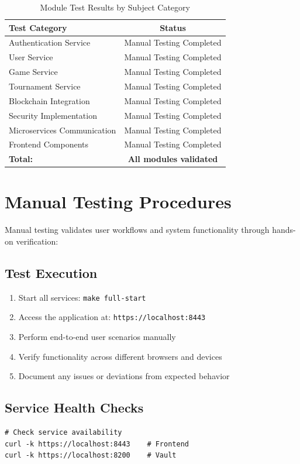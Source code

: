 \documentclass[11pt,a4paper]{report}
\begin{document}
\begin{table}[H]
\centering
\begin{tabular}{|l|c|}
\hline
\textbf{Test Category} & \textbf{Status} \\
\hline
Authentication Service & Manual Testing Completed \\
User Service & Manual Testing Completed \\
Game Service & Manual Testing Completed \\
Tournament Service & Manual Testing Completed \\
Blockchain Integration & Manual Testing Completed \\
Security Implementation & Manual Testing Completed \\
Microservices Communication & Manual Testing Completed \\
Frontend Components & Manual Testing Completed \\
\hline
\textbf{Total:} & \textbf{All modules validated} \\
\hline
\end{tabular}
\caption{Module Test Results by Subject Category}
\label{tab:test_results}
\end{table}

\section{Manual Testing Procedures}
\label{sec:manual_testing}

Manual testing validates user workflows and system functionality through hands-on verification:

\subsection{Test Execution}
\begin{enumerate}
  \item Start all services: \texttt{make full-start}
  \item Access the application at: \texttt{https://localhost:8443}
  \item Perform end-to-end user scenarios manually
  \item Verify functionality across different browsers and devices
  \item Document any issues or deviations from expected behavior
\end{enumerate}

\subsection{Service Health Checks}
\begin{verbatim}
# Check service availability
curl -k https://localhost:8443    # Frontend
curl -k https://localhost:8200    # Vault
\end{verbatim}
\end{document}
